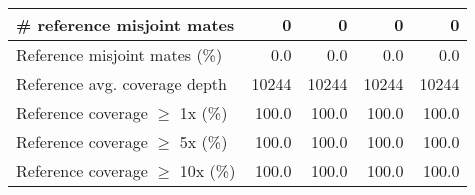 \documentclass[12pt,a4paper]{article}
\begin{document}
\begin{table}[ht]
\begin{center}
\begin{tabular}{|l*{4}{|r}|}
\# reference misjoint mates & 0 & 0 & 0 & 0 \\ \hline
Reference misjoint mates (\%) & 0.0 & 0.0 & 0.0 & 0.0 \\ \hline
Reference avg. coverage depth & 10244 & 10244 & 10244 & 10244 \\ \hline
Reference coverage $\geq$ 1x (\%) & 100.0 & 100.0 & 100.0 & 100.0 \\ \hline
Reference coverage $\geq$ 5x (\%) & 100.0 & 100.0 & 100.0 & 100.0 \\ \hline
Reference coverage $\geq$ 10x (\%) & 100.0 & 100.0 & 100.0 & 100.0 \\ \hline
\end{tabular}
\end{center}
\end{table}
\end{document}
